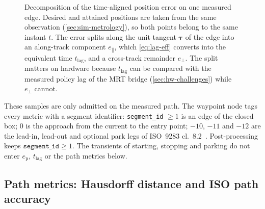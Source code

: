 \begin{figure}[htbp]
  \caption[Decomposition of the time-aligned \ee{} position error]{%
    Decomposition of the time-aligned \ee{} position error on one measured
    edge. Desired and attained positions are taken from the same \mpc{}
    observation (\cref{sec:sim-metrology}), so both points belong to the
    same instant $t$. The error splits along the unit tangent
    $\symbf{\tau}$ of the edge into an along-track component
    $e_{\parallel}$, which \cref{eq:lag-eff} converts into the equivalent
    time $t_{\mathrm{lag}}$, and a cross-track remainder $e_{\perp}$. The
    split matters on hardware because $t_{\mathrm{lag}}$ can be compared
    with the measured policy lag of the MRT bridge
    (\cref{sec:hw-challenges}) while $e_{\perp}$ cannot.}
  \label{fig:ee-error-decomp}
\end{figure}

These samples are only admitted on the measured path. The waypoint node
tags every metric with a segment identifier: \texttt{segment\_id} $\ge
1$ is an edge of the closed box; $0$ is the approach from the current
\ee{} to the entry point; $-10$, $-11$ and $-12$ are the lead-in,
lead-out and optional park legs of ISO~9283 cl.~8.2~\cite{ISO9283}.
Post-processing keeps $\texttt{segment\_id} \ge 1$. The transients of
starting, stopping and parking do not enter $e_{\mathrm{p}}$,
$t_{\mathrm{lag}}$ or the path metrics below.

\subsection{Path metrics: Hausdorff distance and ISO path accuracy}
\label{sec:sim-path-metrics}


